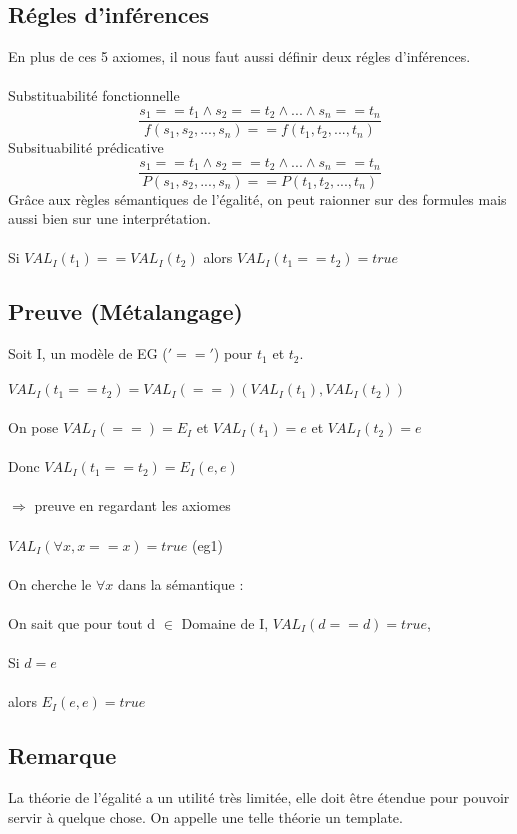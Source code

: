 \subsection{Régles d'inférences}
En plus de ces 5 axiomes, il nous faut aussi définir deux régles d'inférences.\\ \\
Substituabilité fonctionnelle 
	$$ \frac{s_{1}==t_{1} \land s_{2}==t_{2} \land ... \land s_{n}==t_{n}}{f(s_{1},s_{2},...,s_{n}) == f(t_{1},t_{2},...,t_{n})}$$ 
	Subsituabilité prédicative 
	$$ \frac{s_{1}==t_{1} \land s_{2}==t_{2} \land ... \land s_{n}==t_{n}}{P(s_{1},s_{2},...,s_{n}) == P(t_{1},t_{2},...,t_{n})}$$ 
Grâce aux règles sémantiques de l'égalité, on peut raionner sur des formules mais aussi bien sur une interprétation. \\ \\
Si $VAL_{I}(t_{1}) ==  VAL_{I}(t_{2})$ alors $VAL_{I}(t_{1} == t_{2}) = true$
\subsection*{Preuve (Métalangage)}
Soit I, un modèle de EG ($'=='$) pour $t_{1}$ et $t_{2}$. \\ \\
$VAL_{I}(t_{1} == t_{2}) = VAL_{I}(==)(VAL_{I}(t_{1}), VAL_{I}(t_{2}))$\\ \\
On pose $VAL_{I}(==) = E_{I}$ et $VAL_{I}(t_{1}) = e$ et $VAL_{I}(t_{2}) = e$ \\ \\
Donc $VAL_{I}(t_{1} == t_{2}) =E_{I}(e,e)$ \\ \\
$\Rightarrow$ preuve en regardant les axiomes \\ \\
$ VAL_{I}(\forall x, x==x)= true$ (eg1) \\ \\
On cherche le $\forall x$ dans la sémantique : \\ \\
On sait que pour tout d $\in$ Domaine de I, $VAL_{I}(d==d)=true$, \\ \\
Si $d = e$\\ \\
alors $E_{I}(e,e)=true$
\subsection{Remarque}
La théorie de l'égalité a un utilité très limitée, elle doit être étendue pour pouvoir servir à quelque chose. On appelle une telle théorie un template.
